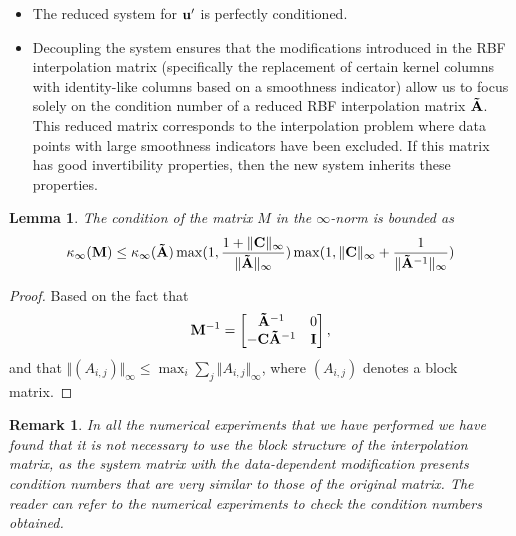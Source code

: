 \documentclass[preprint]{elsarticle}       %
\newtheorem{lemma}[theorem]{Lemma}
\newtheorem{remark}{Remark}
\newtheorem{proof}{Proof}
[section]
\begin{document}
\begin{itemize}
    \item The reduced system for $\bf{u}'$ is perfectly conditioned.%
    \item Decoupling the system ensures that the modifications introduced in the RBF interpolation matrix (specifically the replacement of certain kernel columns with identity-like columns based on a smoothness indicator) allow us to focus solely on the condition number of a reduced RBF interpolation matrix ${\bf \tilde A}$. This reduced matrix corresponds to the interpolation problem where data points with large smoothness indicators have been excluded. If this matrix has good invertibility properties, then the new system inherits these properties.
\end{itemize}

\begin{lemma}
  The condition of the matrix $M$ in the $\infty$-norm is bounded
  as
  \begin{equation*}
    \kappa_{\infty}({\bf M})\leq \kappa_{\infty}({\bf\tilde A})
    \max(1, \frac{1+\Vert {\bf C}\Vert_{\infty}}{\Vert{\bf \tilde
        A}\Vert_{\infty}})
    \max(1, \Vert {\bf C}\Vert_{\infty}+\frac{1}{\Vert{\bf \tilde
        A}^{-1}\Vert_{\infty}})
  \end{equation*}    
  \end{lemma}
  \begin{proof}
    Based on the fact that 
\begin{equation*}
{\bf M}^{-1} = \begin{bmatrix}
{\bf \tilde A}^{-1} & 0 \\
-{\bf C} {\bf \tilde A}^{-1}& {\bf I}
\end{bmatrix},
\end{equation*}
and that $\Vert (A_{i,j})\Vert_{\infty}\leq \max_{i}\sum_{j}\Vert
A_{i,j}\Vert_{\infty}$, where $(A_{i,j})$ denotes a block matrix.
\end{proof}  


\begin{remark}
In all the numerical experiments that we have performed we have found that it is not necessary to use the block structure of the interpolation matrix, as the system matrix with the data-dependent modification presents condition numbers that are very similar to those of the original matrix. The reader can refer to the numerical experiments to check the condition numbers obtained.
\end{remark}
\end{document}

